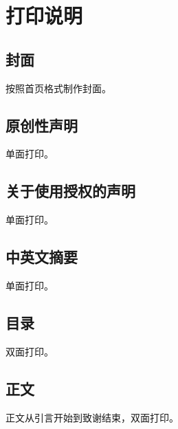 
\chapter{打印说明}
\label{chap03}
\linespread{1.25}
\section{封面}
按照首页格式制作封面。

\section{原创性声明}
单面打印。

\section{关于使用授权的声明}
单面打印。

\section{中英文摘要}
单面打印。

\section{目录}
双面打印。

\section{正文}
正文从引言开始到致谢结束，双面打印。



